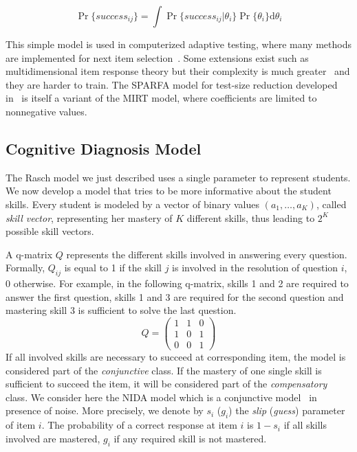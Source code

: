 \documentclass{sig-alternate}
\begin{document}
\[ \Pr\{success_{ij}\} = \int \Pr\{success_{ij}|\theta_i\} \Pr\{\theta_i\} \mathrm d\theta_i \]

This simple model is used in computerized adaptive testing, where many methods are implemented for next item selection~\cite{MagisRaiche2012}. Some extensions exist such as multidimensional item response theory but their complexity is much greater~\cite{Desmarais2012} and they are harder to train. The SPARFA model for test-size reduction developed in~\cite{Vats2013} is itself a variant of the MIRT model, where coefficients are limited to nonnegative values.

\subsection{Cognitive Diagnosis Model}

The Rasch model we just described uses a single parameter to represent students. We now develop a model that tries to be more informative about the student skills. Every student is modeled by a vector of binary values $(a_1, \ldots, a_K)$, called \emph{skill vector}, representing her mastery of $K$ different skills, thus leading to $2^K$ possible skill vectors. 

A q-matrix $Q$ \cite{Tatsuoka1983} represents the different skills involved in answering every question. Formally, $Q_{ij}$ is equal to 1 if the skill $j$ is involved in the resolution of question $i$, 0 otherwise. For example, in the following q-matrix, skills 1 and 2 are required to answer the first question, skills 1 and 3 are required for the second question and mastering skill 3 is sufficient to solve the last question.
\[ Q = \left(\begin{array}{lll}
1 & 1 & 0\\
1 & 0 & 1\\
0 & 0 & 1
\end{array}\right) \]
If all involved skills are necessary to succeed at corresponding item, the model is considered part of the \emph{conjunctive} class. 
If the mastery of one single skill is sufficient to succeed the item, it will be considered part of the \emph{compensatory} class. We consider here the NIDA model which is a conjunctive model~\cite{Desmarais2012} in presence of noise. More precisely, we denote by $s_i$ ($g_i$) the \emph{slip} (\emph{guess}) parameter of item $i$. The probability of a correct response at item $i$ is $1 - s_i$ if all skills involved are mastered, $g_i$ if any required skill is not mastered.
\end{document}
